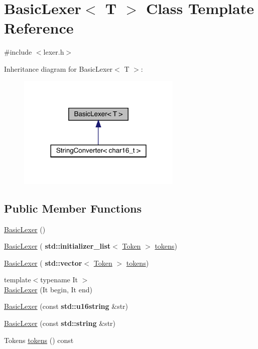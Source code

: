 \hypertarget{class_basic_lexer}{}\section{Basic\+Lexer$<$ T $>$ Class Template Reference}
\label{class_basic_lexer}


{\ttfamily \#include $<$lexer.\+h$>$}



Inheritance diagram for Basic\+Lexer$<$ T $>$\+:\nopagebreak
\begin{figure}[H]
\begin{center}
\leavevmode
\includegraphics[width=222pt]{class_basic_lexer__inherit__graph}
\end{center}
\end{figure}
\subsection*{Public Member Functions}
\begin{DoxyCompactItemize}
\item 
\hyperlink{class_basic_lexer_abc267aed0ef7227486b932f13b2917f0}{Basic\+Lexer} ()
\item 
\hyperlink{class_basic_lexer_a58d2038fb47025d4e32c20750e713b43}{Basic\+Lexer} (\textbf{ std\+::initializer\+\_\+list}$<$ \hyperlink{class_token}{Token} $>$ \hyperlink{class_basic_lexer_ac20fdf19d5602c563b5cad2bae3ad803}{tokens})
\item 
\hyperlink{class_basic_lexer_a1fd5d2795464497ffbe2bf61c892d619}{Basic\+Lexer} (\textbf{ std\+::vector}$<$ \hyperlink{class_token}{Token} $>$ \hyperlink{class_basic_lexer_ac20fdf19d5602c563b5cad2bae3ad803}{tokens})
\item 
{\footnotesize template$<$typename It $>$ }\\\hyperlink{class_basic_lexer_a7b8cb3ec8ba1ef5567bd280800f891f8}{Basic\+Lexer} (It begin, It end)
\item 
\hyperlink{class_basic_lexer_aee8242905dd2c3541322900bdd05a7b7}{Basic\+Lexer} (const \textbf{ std\+::u16string} \&str)
\item 
\hyperlink{class_basic_lexer_ab486a96453887dc7f9efd08c518ae0b0}{Basic\+Lexer} (const \textbf{ std\+::string} \&str)
\item 
Tokens \hyperlink{class_basic_lexer_ac20fdf19d5602c563b5cad2bae3ad803}{tokens} () const
\end{DoxyCompactItemize}



